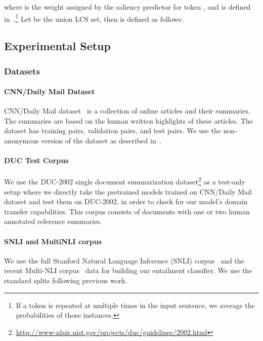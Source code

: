\documentclass[11pt,a4paper]{article}
\begin{document}
where  is the weight assigned by the saliency predictor for token , and  is defined in~.\footnote{If a token is repeated at multiple times in the input sentence, we average the probabilities of those instances.} Let  be the union LCS set, then  is defined as follows:




\subsection{Experimental Setup}
\label{suppl:sec-setup}

\subsubsection{Datasets}
\label{subsec:suppl:datasets}

\paragraph{CNN/Daily Mail Dataset}
CNN/Daily Mail dataset~\cite{hermann2015teaching,nallapati2016abstractive} is a collection of online articles and their summaries. The summaries are based on the human written highlights of these articles. The dataset has  training pairs,  validation pairs, and  test pairs. We use the non-anonymous version of the dataset as described in~.
 
\paragraph{DUC Test Corpus}
We use the DUC-2002 single document summarization dataset\footnote{\scriptsize{\url{http://www-nlpir.nist.gov/projects/duc/guidelines/2002.html}}} as a test-only setup where we directly take the pretrained models trained on CNN/Daily Mail dataset and test them on DUC-2002, in order to check for our model's domain transfer capabilities. This corpus consists of  documents with one or two human annotated reference summaries.


\paragraph{SNLI and MultiNLI corpus}
We use the full Stanford Natural Language Inference (SNLI) corpus~\cite{bowman2015large} and the recent Multi-NLI corpus~\cite{williams2017broad} data for building our entailment classifier. We use the standard splits following previous work.
\end{document}
